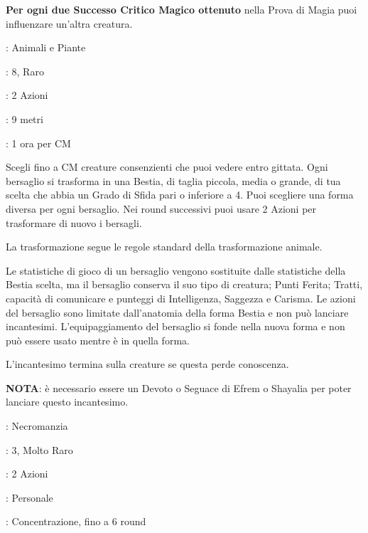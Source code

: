 \begin{multicols}{2}
\textbf{Per ogni due Successo Critico Magico ottenuto} nella Prova di Magia puoi influenzare un'altra creatura.

\label{Animal Shapes}
\noindent\colorbox{OBSSgold!10}{
\begin{minipage}{0.95\linewidth}
\begin{description}[noitemsep, topsep=0pt, parsep=0pt, partopsep=0pt, leftmargin=0cm, labelwidth=1.3cm]
	\item[\textbf{Lista magia}] : Animali e Piante
	\item[\textbf{Livello}] : 8, Raro
	\item[\textbf{T. di Lancio}] : 2 Azioni
	\item[\textbf{Gittata}] : 9 metri
	\item[\textbf{Durata}] : 1 ora per CM
\end{description}
\end{minipage}}\smallskip

Scegli fino a CM creature consenzienti che puoi vedere entro gittata. Ogni bersaglio si trasforma in una Bestia, di taglia piccola, media o grande, di tua scelta che abbia un Grado di Sfida pari o inferiore a 4. Puoi scegliere una forma diversa per ogni bersaglio. Nei round successivi puoi usare 2 Azioni per trasformare di nuovo i bersagli.

La trasformazione segue le regole standard della trasformazione animale.

Le statistiche di gioco di un bersaglio vengono sostituite dalle statistiche della Bestia scelta, ma il bersaglio conserva il suo tipo di creatura; Punti Ferita; Tratti, capacità di comunicare e punteggi di Intelligenza, Saggezza e Carisma. Le azioni del bersaglio sono limitate dall'anatomia della forma Bestia e non può lanciare incantesimi. L'equipaggiamento del bersaglio si fonde nella nuova forma e non può essere usato mentre è in quella forma.

L'incantesimo termina sulla creature se questa perde conoscenza.

\textbf{NOTA}: è necessario essere un Devoto o Seguace di Efrem o Shayalia per poter lanciare questo incantesimo.

\label{Aura of Vitality}
\noindent\colorbox{OBSSgold!10}{
\begin{minipage}{0.95\linewidth}
\begin{description}[noitemsep, topsep=0pt, parsep=0pt, partopsep=0pt, leftmargin=0cm, labelwidth=1.3cm]
	\item[\textbf{Lista di Magia}] : Necromanzia
	\item[\textbf{Livello}] : 3, Molto Raro
	\item[\textbf{T. di Lancio}] : 2 Azioni
	\item[\textbf{Gittata}] : Personale
	\item[\textbf{Durata}] : Concentrazione, fino a 6 round
\end{description}
\end{minipage}}\smallskip


\end{multicols}
